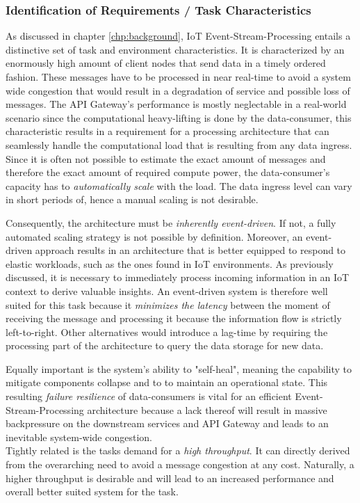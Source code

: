 \subsubsection{Identification of Requirements / Task Characteristics}

As discussed in chapter \ref{chp:background}, IoT Event-Stream-Processing entails a distinctive set of task and environment characteristics. It is characterized by an enormously high amount of client nodes that send data in a timely ordered fashion. These messages have to be processed in near real-time to avoid a system wide congestion that would result in a degradation of service and possible loss of messages. The API Gateway's performance is mostly neglectable in a real-world scenario since the computational heavy-lifting is done by the data-consumer, this characteristic results in a requirement for a processing architecture that can seamlessly handle the computational load that is resulting from any data ingress.\\
Since it is often not possible to estimate the exact amount of messages and therefore the exact amount of required compute power, the data-consumer's capacity has to \textit{automatically scale} with the load. The data ingress level can vary in short periods of, hence a manual scaling is not desirable.

Consequently, the architecture must be \textit{inherently event-driven}. If not, a fully automated scaling strategy is not possible by definition. Moreover, an event-driven approach results in an architecture that is better equipped to respond to elastic workloads, such as the ones found in IoT environments. As previously discussed, it is necessary to immediately process incoming information in an IoT context to derive valuable insights. An event-driven system is therefore well suited for this task because it \textit{minimizes the latency} between the moment of receiving the message and processing it because the information flow is strictly left-to-right. Other alternatives would introduce a lag-time by requiring the processing part of the architecture to query the data storage for new data. 

Equally important is the system's ability to "self-heal", meaning the capability to mitigate components collapse and to to maintain an operational state. This resulting \textit{failure resilience} of data-consumers is vital for an efficient Event-Stream-Processing architecture because a lack thereof will result in massive backpressure on the downstream services and API Gateway and leads to an inevitable system-wide congestion.\\
Tightly related is the tasks demand for a \textit{high throughput}. It can directly derived from the overarching need to avoid a message congestion at any cost. Naturally, a higher throughput is desirable and will lead to an increased performance and overall better suited system for the task.

